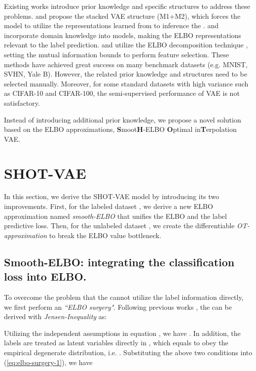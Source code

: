 \documentclass[letterpaper]{article}
\begin{document}
Existing works introduce prior knowledge and specific structures to address these problems. \citet{DBLP:conf/nips/KingmaMRW14} and \citet{DBLP:conf/uai/DavidsonFCKT18} propose the stacked VAE structure (M1+M2), which forces the model to utilize the representations learned from  to inference the . \citet{DBLP:journals/corr/LouizosSLWZ15} and \citet{DBLP:conf/iclr/IlseTLW19} incorporate domain knowledge into models, making the ELBO representations relevant to the label prediction. \citet{DBLP:journals/corr/ZhaoSE17b} and \citet{DBLP:conf/nips/Dupont18} utilize the ELBO decomposition technique \citep{hoffman2016elbo}, setting the mutual information bounds to perform feature selection. These methods have achieved great success on many benchmark datasets (e.g. MNIST, SVHN, Yale B). However, the related prior knowledge and structures need to be selected manually. Moreover, for some standard datasets with high variance such as CIFAR-10 and CIFAR-100, the semi-supervised performance of VAE is not satisfactory.

Instead of introducing additional prior knowledge, we propose a novel solution based on the ELBO approximations, \textbf{S}moot\textbf{H}-ELBO \textbf{O}ptimal in\textbf{T}erpolation VAE. 

 \section{SHOT-VAE}
In this section, we derive the SHOT-VAE model by introducing its two improvements. First, for the labeled dataset , we derive a new ELBO approximation named \textit{smooth-ELBO} that unifies the ELBO and the label predictive loss. Then, for the unlabeled dataset , we create the differentiable \textit{OT-approximation} to break the ELBO value bottleneck.
\label{sec:SHOT-VAE}
\subsection{Smooth-ELBO: integrating the classification loss into ELBO.}
\label{subsec:smooth-ELBO-experiment}
To overcome the problem that the  cannot utilize the label information directly, we first perform an \textit{``ELBO surgery"}. Following previous works \citep{DBLP:journals/corr/Doersch16}, the  can be derived with \textit{Jensen-Inequality} as:


Utilizing the independent assumptions in equation , we have . In addition, the labels  are treated as latent variables directly in , which equals to obey the empirical degenerate distribution, i.e. . Substituting the above two conditions into (\ref{eq:elbo-surgery-1}), we have
\end{document}

